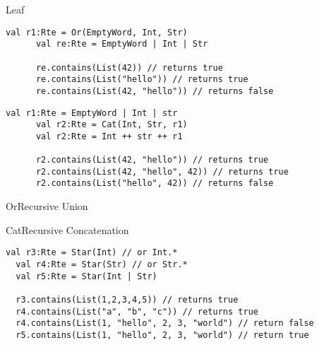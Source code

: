 \begin{frame}{Leaf}
  \usebox\leafbox
\end{frame}

\newsavebox\orbox
\begin{lrbox}{\orbox}
  \begin{minipage}{12cm}
    \begin{lstlisting}[style=scalaioScala]
      val r1:Rte = Or(EmptyWord, Int, Str)
      val re:Rte = EmptyWord | Int | Str
      
      re.contains(List(42)) // returns true
      re.contains(List("hello")) // returns true
      re.contains(List(42, "hello")) // returns false

    \end{lstlisting}
  \end{minipage}
\end{lrbox}

\newsavebox\catbox
\begin{lrbox}{\catbox}
  \begin{minipage}{12cm}
    \begin{lstlisting}[style=scalaioScala]
      val r1:Rte = EmptyWord | Int | str
      val r2:Rte = Cat(Int, Str, r1)
      val r2:Rte = Int ++ str ++ r1

      r2.contains(List(42, "hello")) // returns true
      r2.contains(List(42, "hello", 42)) // returns true
      r2.contains(List("hello", 42)) // returns false
    \end{lstlisting}
  \end{minipage}
\end{lrbox}


\begin{frame}{Or}{Recursive Union}
  \usebox\orbox
 \end{frame}

\begin{frame}{Cat}{Recursive Concatenation}
  \usebox\catbox
 \end{frame}



\newsavebox\starbox
\begin{lrbox}{\starbox}
  \begin{minipage}{12cm}
\begin{lstlisting}[style=scalaioScala]
  val r3:Rte = Star(Int) // or Int.*
  val r4:Rte = Star(Str) // or Str.*
  val r5:Rte = Star(Int | Str) 
  
  r3.contains(List(1,2,3,4,5)) // returns true
  r4.contains(List("a", "b", "c")) // returns true
  r4.contains(List(1, "hello", 2, 3, "world") // return false
  r5.contains(List(1, "hello", 2, 3, "world") // return true
\end{lstlisting}
  \end{minipage}
\end{lrbox}


